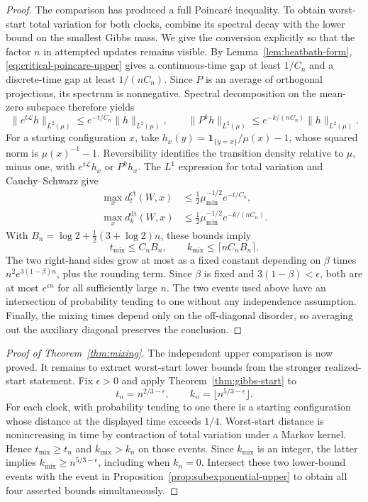 \begin{proof}
The comparison has produced a full Poincar\'e inequality. To obtain
worst-start total variation for both clocks, combine its spectral decay
with the lower bound on the smallest Gibbs mass. We give the conversion
explicitly so that the factor $n$ in attempted updates remains visible.  By Lemma~\ref{lem:heatbath-form},
\eqref{eq:critical-poincare-upper} gives a continuous-time gap at least
$1/C_n$ and a discrete-time gap at least $1/(nC_n)$.  Since $P$ is an
average of orthogonal projections, its spectrum is nonnegative.
Spectral decomposition on the mean-zero subspace therefore yields
\[
 \|e^{t\mathcal L}h\|_{L^2(\mu)}
 \le e^{-t/C_n}\|h\|_{L^2(\mu)},
 \qquad
 \|P^kh\|_{L^2(\mu)}
 \le e^{-k/(nC_n)}\|h\|_{L^2(\mu)}.
\]
For a starting configuration $x$, take
$h_x(y)=\mathbf1_{\{y=x\}}/\mu(x)-1$, whose squared norm is
$\mu(x)^{-1}-1$.  Reversibility identifies the transition density
relative to $\mu$, minus one, with $e^{t\mathcal L}h_x$ or $P^kh_x$.
The $L^1$ expression for total variation and Cauchy--Schwarz give
\begin{align}
 \max_x d_t^{\mathrm{ct}}(W,x)
 &\le\tfrac12\mu_{\min}^{-1/2}e^{-t/C_n},\label{eq:gap-tv-ct}\\
 \max_x d_k^{\mathrm{dt}}(W,x)
 &\le\tfrac12\mu_{\min}^{-1/2}e^{-k/(nC_n)}.
 \label{eq:gap-tv-dt}
\end{align}
With $B_n=\log2+\tfrac12(3+\log2)n$, these bounds imply
\[
 t_{\mathrm{mix}}\le C_nB_n,
 \qquad
 k_{\mathrm{mix}}\le\lceil nC_nB_n\rceil.
\]
The two right-hand sides grow at most as a fixed constant depending
on $\beta$ times $n^2e^{3(1-\beta)n}$, plus the rounding term.
Since $\beta$ is fixed and $3(1-\beta)<\epsilon$, both are at most
$e^{\epsilon n}$ for all sufficiently large $n$.
The two events used above have an intersection of probability tending
to one without any independence assumption.  Finally, the mixing
times depend only on the off-diagonal disorder, so averaging out the
auxiliary diagonal preserves the conclusion.
\end{proof}

\begin{proof}[Proof of Theorem~\ref{thm:mixing}]
The independent upper comparison is now proved. It remains to
extract worst-start lower bounds from the stronger realized-start
statement. Fix $\epsilon>0$ and apply Theorem~\ref{thm:gibbs-start} to
\[
 t_n=n^{2/3-\epsilon},\qquad
 k_n=\lfloor n^{5/3-\epsilon}\rfloor.
\]
For each clock, with probability tending to one there is a starting
configuration whose distance at the displayed time exceeds $1/4$.
Worst-start distance is nonincreasing in time by contraction of total
variation under a Markov kernel.  Hence
$t_{\mathrm{mix}}\ge t_n$ and $k_{\mathrm{mix}}>k_n$ on those events.
Since $k_{\mathrm{mix}}$ is an integer, the latter implies
$k_{\mathrm{mix}}\ge n^{5/3-\epsilon}$, including when $k_n=0$.
Intersect these two lower-bound events with the event in
Proposition~\ref{prop:subexponential-upper} to obtain all four asserted
bounds simultaneously.
\end{proof}

